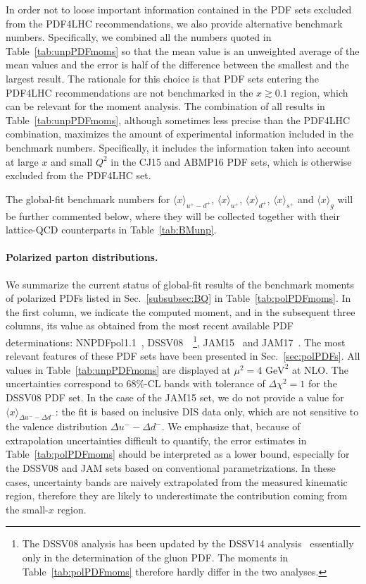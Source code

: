 In order not to loose important information contained in the PDF sets excluded 
from the PDF4LHC recommendations, we also provide alternative benchmark numbers.
%
Specifically, we combined all the numbers quoted in Table~\ref{tab:unpPDFmoms}
so that the mean value is an unweighted average of the mean 
values and the error is half of the difference between the smallest and the 
largest result.
%
The rationale for this choice is that PDF sets entering the PDF4LHC 
recommendations are not benchmarked in the $x\gtrsim 0.1$ region, which can be 
relevant for the moment analysis.
%
The combination of all results in Table~\ref{tab:unpPDFmoms}, although 
sometimes less precise than the PDF4LHC combination, maximizes the amount of 
experimental information included in the benchmark numbers.
%
Specifically, it includes the information taken into account 
at large $x$ and small $Q^2$ in the CJ15 and ABMP16 PDF sets, 
which is otherwise excluded from the PDF4LHC set.

The global-fit benchmark numbers for $\langle x\rangle_{u^+-d^+}$,
$\langle x \rangle_{u^+}$, $\langle x \rangle_{d^+}$, 
$\langle x \rangle_{s^+}$ and $\langle x \rangle_g$ will be further
commented below, where they will be collected together with their 
lattice-QCD counterparts in Table~\ref{tab:BMunp}.

\paragraph{Polarized parton distributions.}
%
We summarize the current status of global-fit results of the benchmark
moments of polarized PDFs listed in Sec.~\ref{subsubsec:BQ} in 
Table~\ref{tab:polPDFmoms}.
%
In the first column, we indicate the computed moment, and in the subsequent 
three columns, its value as obtained from the most recent available PDF 
determinations: NNPDFpol1.1~\cite{Nocera:2014gqa}, 
DSSV08~\cite{deFlorian:2009vb}~\footnote{The DSSV08 analysis has been updated
by the DSSV14 analysis~\cite{deFlorian:2014yva} essentially 
only in the determination of the gluon PDF. 
The moments in Table~\ref{tab:polPDFmoms} therefore hardly differ
in the two analyses.}, JAM15~\cite{Sato:2016tuz} and 
JAM17~\cite{Ethier:2017zbq}.
%
The most relevant features of these PDF sets have been presented in
Sec.~\ref{sec:polPDFs}.
%
All values in Table~\ref{tab:unpPDFmoms} are displayed
at $\mu^2=4\mbox{ GeV}^2$ at NLO.
%
The uncertainties correspond to 68\%-CL bands with tolerance of 
$\Delta \chi^2=1$ for the DSSV08 PDF set.
%
In the case of the JAM15 set, we do not provide a value for 
$\langle x \rangle _{\Delta u^--\Delta d^-}$:
the fit is based on inclusive DIS data only, which are not sensitive to 
the valence distribution $\Delta u^- - \Delta d^-$.
%
We emphasize that, because of extrapolation uncertainties difficult to quantify,
the error estimates in Table~\ref{tab:polPDFmoms} should be interpreted
as a lower bound, especially for the DSSV08 and JAM sets based on 
conventional parametrizations.
%
In these cases, uncertainty bands are naively extrapolated from the measured 
kinematic region, therefore they are likely to underestimate the contribution 
coming from the small-$x$ region.

